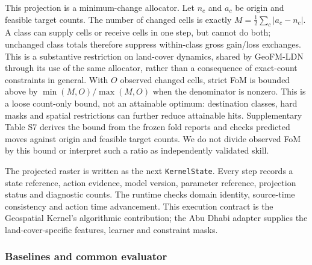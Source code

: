 This projection is a minimum-change allocator. Let \(n_c\) and \(a_c\)
be origin and feasible target counts. The number of changed cells is
exactly \(M=\frac12\sum_c|a_c-n_c|\). A class can supply cells or
receive cells in one step, but cannot do both; unchanged class totals
therefore suppress within-class gross gain/loss exchanges. This is a
substantive restriction on land-cover dynamics, shared by GeoFM-LDN
through its use of the same allocator, rather than a consequence of
exact-count constraints in general. With \(O\) observed changed cells,
strict FoM is bounded above by \(\min(M,O)/\max(M,O)\) when the
denominator is nonzero. This is a loose count-only bound, not an
attainable optimum: destination classes, hard masks and spatial
restrictions can further reduce attainable hits. Supplementary Table S7
derives the bound from the frozen fold reports and checks predicted
moves against origin and feasible target counts. We do not divide
observed FoM by this bound or interpret such a ratio as independently
validated skill.

The projected raster is written as the next \texttt{KernelState}. Every
step records a state reference, action evidence, model version,
parameter reference, projection status and diagnostic counts. The
runtime checks domain identity, source-time consistency and action time
advancement. This execution contract is the Geospatial Kernel's
algorithmic contribution; the Abu Dhabi adapter supplies the
land-cover-specific features, learner and constraint masks.

\subsubsection{Baselines and common
evaluator}\label{baselines-and-common-evaluator}

